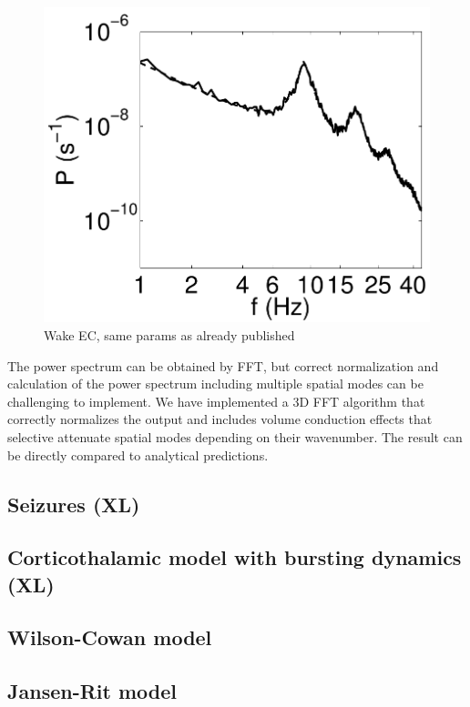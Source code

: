 \documentclass[preprint,review,10pt,authoryear,letterpaper]{elsarticle}
\begin{document}
\begin{figure}[!b]
\begin{center}
\includegraphics[width=0.70\columnwidth]{corticothalamic_comparison}
\caption{Wake EC, same params as already published}
\label{fig:ct_spectrum_1}
\end{center}
\end{figure}

The power spectrum can be obtained by FFT, but correct normalization and calculation of the power spectrum including multiple spatial modes can be challenging to implement. We have implemented a 3D FFT algorithm that correctly normalizes the output and includes volume conduction effects that selective attenuate spatial modes depending on their wavenumber. The result can be directly compared to analytical predictions. 

\clearpage

\subsection{Seizures (XL)}
\label{sec:seizures}

\subsection{Corticothalamic model with bursting dynamics (XL)}
\label{sec:burst}

\subsection{Wilson-Cowan model}

\subsection{Jansen-Rit model}
\end{document}
